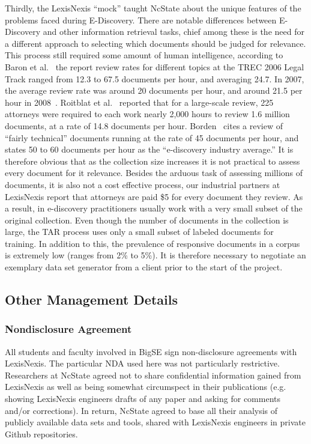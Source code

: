 \documentclass{sig-alternate-05-2015}
\begin{document}
Thirdly, the LexisNexis ``mock'' taught  NcState about the unique features of
the problems faced during E-Discovery. 
There are notable differences between E-Discovery and other information retrieval tasks, chief among these is the need for a different approach to selecting which documents should be judged for relevance. This process still required some amount of human intelligence, according to Baron et al.~\cite{baron2006trec} the report review rates for different topics at the TREC 2006 Legal Track ranged from 12.3 to 67.5 documents per hour, and averaging 24.7. In 2007, the average review rate was around 20 documents per hour, and around 21.5 per hour in 2008~\cite{oard08}. Roitblat et al.~\cite{roitblat} reported that for a large-scale review, 225 attorneys were required to each work nearly 2,000 hours to review 1.6 million documents, at a rate of 14.8 documents per hour. Borden~\cite{borden} cites a review of ``fairly technical'' documents running at the rate of 45 documents per hour, and states 50 to 60 documents per hour as the ``e-discovery industry average.'' It is therefore obvious that as the collection size increases it is not practical to assess every document for it relevance. Besides the arduous task of assessing millions of documents, it is also not a cost effective process, our industrial partners at LexisNexis report that attorneys are paid \$5 for every document they review. As a result, in e-discovery practitioners usually work with a very small subset of the original collection. Even though the number of documents in the collection is large, the TAR process uses only a small subset of labeled documents for training. In addition to this, the prevalence of responsive documents in a corpus is extremely low (ranges from 2\% to 5\%).
It is therefore necessary to negotiate an exemplary data set generator from a
client prior to the start of the project.  
\subsection{Other Management Details}

\subsubsection{Nondisclosure Agreement}

All students and faculty involved in BigSE
 sign non-disclosure agreements with LexisNexis. The particular NDA used
 here was not particularly restrictive. Researchers at NcState agreed not to share confidential
 information gained from LexisNexis as well as being somewhat circumspect in their publications
 (e.g. showing LexisNexis engineers drafts of any paper and asking for comments and/or
 corrections).    In return, NcState agreed to base all their analysis of   publicly
 available data sets and tools, shared with LexisNexis engineers in private Github repositories. 
 
\end{document}
